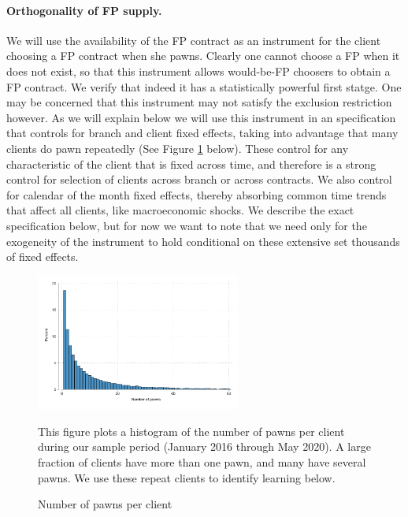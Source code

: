 \paragraph{Orthogonality of FP supply.} We will use the availability of the FP contract as an instrument for the client choosing a FP contract when she pawns. Clearly one cannot choose a FP when it does not exist, so that this instrument allows would-be-FP choosers to obtain a FP contract. We verify that indeed it has a statistically powerful first statge. One may be concerned that this instrument may not satisfy the exclusion restriction however. As we will explain below we will use this instrument in an specification that controls for branch and client fixed effects, taking into advantage that many clients do pawn repeatedly (See Figure \ref{hist_num_pawns} below). These control for any characteristic of the client that is fixed across time, and therefore is a strong control for selection of clients across branch or across contracts. We also control for calendar of the month fixed effects, thereby absorbing common time trends that affect all clients, like macroeconomic shocks. We describe the exact specification below, but for now we want to note that we need only for the exogeneity of the instrument to hold conditional on these extensive set thousands of fixed effects. 

    \vspace{.1in}
\begin{figure}[H]
        \caption{Number of pawns per client}
    \label{hist_num_pawns}
    \begin{center}
        \centering
        \includegraphics[width=0.6\textwidth]{Figuras/hist_num_pawns.pdf}
    \end{center}
     \scriptsize This figure plots a histogram of the number of pawns per client during our sample period (January 2016 through May 2020). A large fraction of clients have more than one pawn, and many have several pawns. We use these repeat clients to identify learning below. 
\end{figure}
\vspace{.1in}

